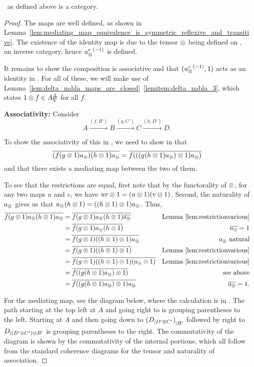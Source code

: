 \begin{lemma}\label{lem:xt_is_a_category}
  \Xt\ as defined above is a category.
\end{lemma}
\begin{proof}
  The maps are well defined, as shown in
  Lemma~\ref{lem:mediating_map_equivalence_is_symmetric_reflexive_and_transitive}. The existence of
  the identity map is due to the tensor $\otimes$ being defined on \X, an inverse category, hence
  ${u_{\otimes}^r}^{(-1)}$ is defined.

  It remains to show the composition is associative and that $({u_{\otimes}^r}^{(-1)}, 1)$ acts as an identity
  in \Xt. For all of these, we will make use of
  Lemma~\ref{lem:delta_nabla_maps_are_closed}~\ref{lemitem:delta_nabla_3},  which states $1\otimes f \in
  {A}^{\Delta}_{\nabla}$ for all $f$.

  \textbf{Associativity:}
  Consider
  \[
    A\xrightarrow{(f,B')}B\xrightarrow{(g,C')} C \xrightarrow{(h,D')}D.
  \]

  To show the associativity of this in \Xt, we need to show in \X that
  \[
    \overline{(f(g\otimes1)a_{\otimes}) (h\otimes1)a_{\otimes}} = \overline{f (((g(h\otimes1)a_{\otimes})\otimes1) a_{\otimes})}
  \]
  and that there exists a mediating map between the two of them.

  To see that the restrictions are equal, first note that by the functorality of $\otimes$, for any two
  maps $u$ and $v$, we have $u v \otimes 1 = (u\otimes1) (v\otimes1)$. Second, the naturality of $a_{\otimes}$ gives us
  that $a_{\otimes} (h \otimes 1) = ((h\otimes1)\otimes1) a_{\otimes}$. Thus,
  \begin{align*}
    \overline{f(g\otimes1)a_{\otimes} (h\otimes1)a_{\otimes}}
      & = \overline{f(g\otimes1)a_{\otimes} (h\otimes1)\overline{a_{\otimes}}}
    & \text{Lemma \ref{lem:restrictionvarious}} \\
    & = \overline{f(g\otimes1)a_{\otimes} (h\otimes1)} & \overline{a_{\otimes}}=1 \\
    & = \overline{f(g\otimes1) ((h\otimes1)\otimes1) a_{\otimes} } & a_{\otimes}\text{ natural} \\
    & = \overline{f(g\otimes1) ((h\otimes1)\otimes1) }
      &  \text{Lemma \ref{lem:restrictionvarious}}\\
    & = \overline{f(g\otimes1) ((h\otimes1)\otimes1) (a_{\otimes}\otimes1)}
      & \text{Lemma \ref{lem:restrictionvarious}}\\
    & = \overline{f((g (h\otimes1)a_{\otimes} )\otimes1)} & \text{ see above}\\
    & = \overline{f((g (h\otimes1)a_{\otimes} )\otimes1)a_{\otimes}} & \overline{a_{\otimes}}=1 .
  \end{align*}

  For the mediating map, see the diagram below, where the calculation is in \X. The path starting at
  the top left at $A$ and going right to  is grouping parentheses to the
  left. Starting at $A$ and then going down to ${({D}_{|{D' \otimes C'}})}_{|{B'}}$ followed by
  right to $ {D}_{|{(D' \otimes C') \otimes B'}}$ is grouping parentheses to the right. The
  commutativity of the diagram is shown by the commutativity of the internal portions, which all
  follow from the standard coherence diagrams for the tensor and naturality of association.


\end{proof}
